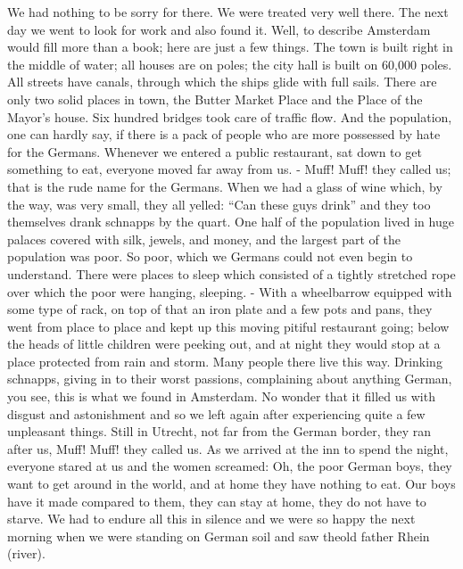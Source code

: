 \documentclass{article}
\begin{document}
We had nothing to be sorry for there. We were treated very well there. The next day we went to look for work and also found it. Well, to describe Amsterdam would fill more than a book; here are just a few things. The town is built right in the middle of water; all houses are on poles; the city hall is built on 60,000 poles. All streets have canals, through which the ships glide with full sails. There are only two solid places in town, the Butter Market Place and the Place of the Mayor's house. Six hundred bridges took care of traffic flow. And the population, one can hardly say, if there is a pack of people who are more possessed by hate for the Germans. Whenever we entered a public restaurant, sat down to get something to eat, everyone moved far away from us. - Muff! Muff! they called us; that is the rude name for the Germans. When we had a glass of wine which, by the way, was very small, they all yelled: ``Can these guys drink'' and they too themselves drank schnapps by the quart. One half of the population lived in huge palaces covered with silk, jewels, and money, and the largest part of the population was poor. So poor, which we Germans could not even begin to understand. There were places to sleep which consisted of a tightly stretched rope over which the poor were hanging, sleeping. - With a wheelbarrow equipped with some type of rack, on top of that an iron plate and a few pots and pans, they went from place to place and kept up this moving pitiful restaurant going; below the heads of little children were peeking out, and at night they would stop at a place protected from rain and storm. Many people there live this way. Drinking schnapps, giving in to their worst passions, complaining about anything German, you see, this is what we found in Amsterdam. No wonder that it filled us with disgust and astonishment and so we left again after experiencing quite a few unpleasant things. Still in Utrecht, not far from the German border, they ran after us, Muff! Muff! they called us. As we arrived at the inn to spend the night, everyone stared at us and the women screamed: Oh, the poor German boys, they want to get around in the world, and at home they have nothing to eat. Our boys have it made compared to them, they can stay at home, they do not have to starve. We had to endure all this in silence and we were so happy the next morning when we were standing on German soil and saw theold father Rhein (river).
\end{document}

